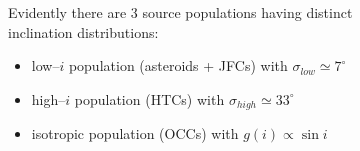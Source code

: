 \documentclass[20pt,35mmSlide,landscape]{foils}
\begin{document}
\newpage
\pagecolor{light-yellow}
\normalsize

\vspace*{-1.5in}\parbox{10in}{
{\large Evidently there are 3 source populations having distinct\\
inclination distributions:}

\begin{itemize}

\item low--$i$ population (asteroids + JFCs) with
$\sigma_{low}\simeq7^\circ$

\item high--$i$ population (HTCs) with
$\sigma_{high}\simeq33^\circ$

\item isotropic population (OCCs) with $g(i)\propto\sin i$

\end{itemize}
}
\vspace*{-1.5in}\hspace*{-0.3in}\parbox{11in}{
\parbox[t]{3.67in}{
\begin{figure}
\end{figure}
}
\parbox[t]{3.66in}{
\begin{figure}
\end{figure}
}
\parbox[t]{3.67in}{
\begin{figure}
\end{figure}
}
}

\newpage
\pagecolor{light-yellow}
\normalsize
\end{document}
